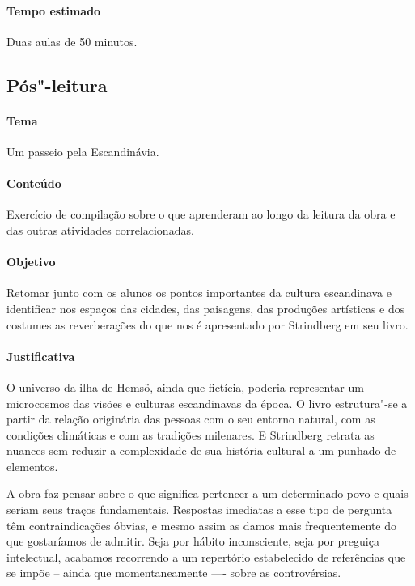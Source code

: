 \documentclass[12pt]{extarticle}
\begin{document}
\paragraph{Tempo estimado} Duas aulas de 50 minutos.


\subsection{Pós"-leitura}

\paragraph{Tema} Um passeio pela Escandinávia. 

\paragraph{Conteúdo} Exercício de compilação sobre o que aprenderam 
ao longo da leitura da obra e das outras 
atividades correlacionadas. 

\paragraph{Objetivo} Retomar junto com os alunos os pontos importantes da 
cultura escandinava e identificar 
nos espaços das cidades, das paisagens, das produções artísticas e dos 
costumes as reverberações do que nos 
é apresentado por Strindberg em seu livro. 

\paragraph{Justificativa} O universo da ilha de Hemsö, ainda 
que fictícia, poderia representar um microcosmos 
das visões e culturas escandinavas da época. O livro estrutura"-se a 
partir da relação originária das pessoas 
com o seu entorno natural, com as condições climáticas e com as 
tradições milenares. E Strindberg retrata 
as nuances sem reduzir a complexidade de sua história cultural 
a um punhado de elementos.

A obra faz pensar sobre o que significa pertencer a um determinado povo e 
quais seriam seus traços fundamentais. 
Respostas imediatas a esse tipo de pergunta têm contraindicações óbvias, 
e mesmo assim as damos mais frequentemente 
do que gostaríamos de admitir. Seja por hábito inconsciente, seja por 
preguiça intelectual, acabamos recorrendo a um 
repertório estabelecido de referências que se impõe -- ainda que 
momentaneamente —- sobre as controvérsias.
\end{document}
